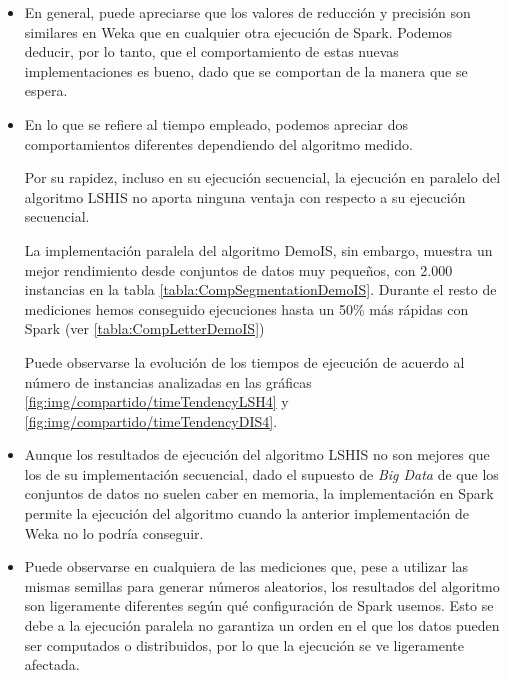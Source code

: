 \begin{itemize}
	\item En general, puede apreciarse que los valores de reducción y precisión son similares en Weka que en cualquier otra ejecución de Spark. Podemos deducir, por lo tanto, que el comportamiento de estas nuevas implementaciones es bueno, dado que se comportan de la manera que se espera.
	
	\item En lo que se refiere al tiempo empleado, podemos apreciar dos comportamientos diferentes dependiendo del algoritmo medido.
	
	Por su rapidez, incluso en su ejecución secuencial, la ejecución en paralelo del algoritmo LSHIS no aporta ninguna ventaja con respecto a su ejecución secuencial.
	
	La implementación paralela del algoritmo DemoIS, sin embargo, muestra un mejor rendimiento desde conjuntos de datos muy pequeños, con 2.000 instancias en la tabla \ref{tabla:CompSegmentationDemoIS}. Durante el resto de mediciones hemos conseguido ejecuciones hasta un 50\% más rápidas con Spark (ver \ref{tabla:CompLetterDemoIS})
	
	Puede observarse la evolución de los tiempos de ejecución de acuerdo al número de instancias analizadas en las gráficas \ref{fig:img/compartido/timeTendencyLSH4} y \ref{fig:img/compartido/timeTendencyDIS4}.
	
	
	
	\item Aunque los resultados de ejecución del algoritmo LSHIS no son mejores que los de su implementación secuencial, dado el supuesto de \textit{Big Data} de que los conjuntos de datos no suelen caber en memoria, la implementación en Spark permite la ejecución del algoritmo cuando la anterior implementación de Weka no lo podría conseguir.
	
	\item Puede observarse en cualquiera de las mediciones que, pese a utilizar las mismas semillas para generar números aleatorios, los resultados del algoritmo son ligeramente diferentes según qué configuración de Spark usemos. Esto se debe a la ejecución paralela no garantiza un orden en el que los datos pueden ser computados o distribuidos, por lo que la ejecución se ve ligeramente afectada.
	

\end{itemize}
